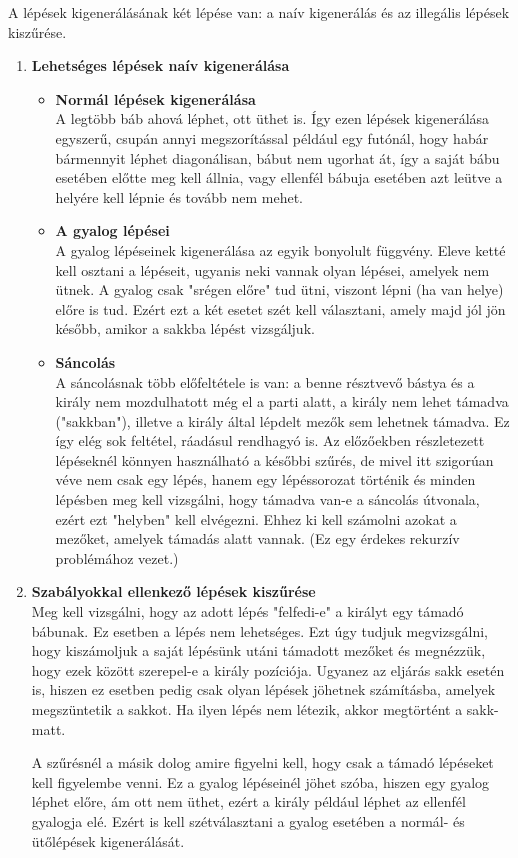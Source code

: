 \documentclass[twoside, a4paper, 12pt]{article}
\begin{document}
A lépések kigenerálásának két lépése van: a naív kigenerálás és az illegális lépések kiszűrése.
\begin{enumerate}
	\item \textbf{Lehetséges lépések naív kigenerálása}
	\begin{itemize}
		\item \textbf{Normál lépések kigenerálása} \\
		A legtöbb báb ahová léphet, ott üthet is. Így ezen lépések kigenerálása egyszerű, csupán annyi megszorítással például egy futónál, hogy habár bármennyit léphet diagonálisan, bábut nem ugorhat át, így a saját bábu esetében előtte meg kell állnia, vagy ellenfél bábuja esetében azt leütve a helyére kell lépnie és tovább nem mehet.
		
		\item \textbf{A gyalog lépései} \\
		A gyalog lépéseinek kigenerálása az egyik bonyolult függvény. Eleve ketté kell osztani a lépéseit, ugyanis neki vannak olyan lépései, amelyek nem ütnek. A gyalog csak "srégen előre" tud ütni, viszont lépni (ha van helye) előre is tud. Ezért ezt a két esetet szét kell választani, amely majd jól jön később, amikor a sakkba lépést vizsgáljuk. 
		
		\item \textbf{Sáncolás} \\
		A sáncolásnak több előfeltétele is van: a benne résztvevő bástya és a király nem mozdulhatott még el a parti alatt, a király nem lehet támadva ("sakkban"), illetve a király által lépdelt mezők sem lehetnek támadva. Ez így elég sok feltétel, ráadásul rendhagyó is. Az előzőekben részletezett lépéseknél könnyen használható a későbbi szűrés, de mivel itt szigorúan véve nem csak egy lépés, hanem egy lépéssorozat történik és minden lépésben meg kell vizsgálni, hogy támadva van-e a sáncolás útvonala, ezért ezt "helyben" kell elvégezni. Ehhez ki kell számolni azokat a mezőket, amelyek támadás alatt vannak. (Ez egy érdekes rekurzív problémához vezet.)
	\end{itemize}
	
	\item \textbf{Szabályokkal ellenkező lépések kiszűrése} \\
	Meg kell vizsgálni, hogy az adott lépés "felfedi-e" a királyt egy támadó bábunak. Ez esetben a lépés nem lehetséges. Ezt úgy tudjuk megvizsgálni, hogy kiszámoljuk a saját lépésünk utáni támadott mezőket és megnézzük, hogy ezek között szerepel-e a király pozíciója. Ugyanez az eljárás sakk esetén is, hiszen ez esetben pedig csak olyan lépések jöhetnek számításba, amelyek megszüntetik a sakkot. Ha ilyen lépés nem létezik, akkor megtörtént a sakk-matt.
	
	A szűrésnél a másik dolog amire figyelni kell, hogy csak a támadó lépéseket kell figyelembe venni. Ez a gyalog lépéseinél jöhet szóba, hiszen egy gyalog léphet előre, ám ott nem üthet, ezért a király például léphet az ellenfél gyalogja elé. Ezért is kell szétválasztani a gyalog esetében a normál- és ütőlépések kigenerálását.
\end{enumerate}
\end{document}
